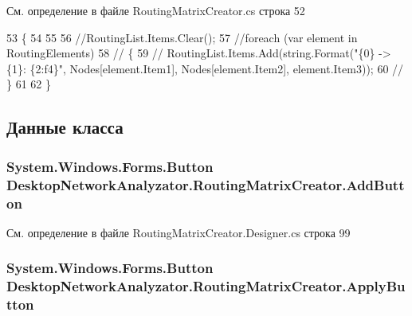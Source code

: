 См. определение в файле Routing\+Matrix\+Creator.\+cs строка 52


\begin{DoxyCode}
53         \{
54             
55             
56             \textcolor{comment}{//RoutingList.Items.Clear();}
57            \textcolor{comment}{//foreach (var element in RoutingElements)}
58            \textcolor{comment}{// \{}
59                \textcolor{comment}{// RoutingList.Items.Add(string.Format("\{0\} -> \{1\}:  \{2:f4\}", Nodes[element.Item1],
       Nodes[element.Item2], element.Item3));}
60           \textcolor{comment}{//  \}}
61 
62         \}
\end{DoxyCode}


\subsection{Данные класса}
\subsubsection[{\texorpdfstring{Add\+Button}{AddButton}}]{\setlength{\rightskip}{0pt plus 5cm}System.\+Windows.\+Forms.\+Button Desktop\+Network\+Analyzator.\+Routing\+Matrix\+Creator.\+Add\+Button\hspace{0.3cm}{\ttfamily [private]}}\hypertarget{class_desktop_network_analyzator_1_1_routing_matrix_creator_ab3039583fac66f9f966b4443d052e668}{}\label{class_desktop_network_analyzator_1_1_routing_matrix_creator_ab3039583fac66f9f966b4443d052e668}


См. определение в файле Routing\+Matrix\+Creator.\+Designer.\+cs строка 99

\subsubsection[{\texorpdfstring{Apply\+Button}{ApplyButton}}]{\setlength{\rightskip}{0pt plus 5cm}System.\+Windows.\+Forms.\+Button Desktop\+Network\+Analyzator.\+Routing\+Matrix\+Creator.\+Apply\+Button\hspace{0.3cm}{\ttfamily [private]}}\hypertarget{class_desktop_network_analyzator_1_1_routing_matrix_creator_aa0d7f9966943f9bb5885bde68a3266ac}{}\label{class_desktop_network_analyzator_1_1_routing_matrix_creator_aa0d7f9966943f9bb5885bde68a3266ac}


